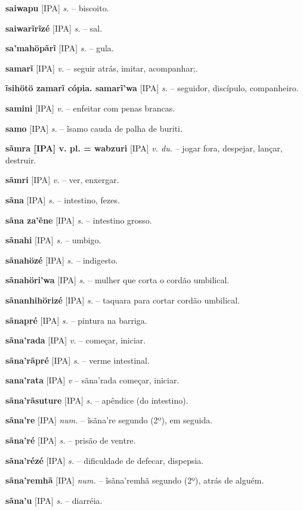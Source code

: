 {\textbf{saiwapu} [IPA] \textit{s.} -- biscoito.

\textbf{saiwarĩrĩzé} [IPA] \textit{s.} -- sal.

\textbf{sa'mahöpãrĩ} [IPA] \textit{s.} -- gula.

\textbf{samarĩ} [IPA] \textit{v.} -- seguir atrás, imitar, acompanhar;.

\textbf{ĩsihötö zamarĩ cópia. samarĩ'wa} [IPA] \textit{s.} -- seguidor, discípulo, companheiro.

\textbf{samini} [IPA] \textit{v.} -- enfeitar com penas brancas.

\textbf{samo} [IPA] \textit{s.} -- ĩsamo cauda de palha de buriti.

\textbf{sãmra [IPA] v. pl. = wabzuri} [IPA] \textit{v. du.} -- jogar fora, despejar, lançar, destruir.

\textbf{sãmri} [IPA] \textit{v.} -- ver, enxergar.

\textbf{sãna} [IPA] \textit{s.} -- intestino, fezes.

\textbf{sãna za'ẽne} [IPA] \textit{s.} -- intestino grosso.

\textbf{sãnahi} [IPA] \textit{s.} -- umbigo.

\textbf{sãnahözé} [IPA] \textit{s.} -- indigesto.

\textbf{sãnahöri'wa} [IPA] \textit{s.} -- mulher que corta o cordão umbilical.

\textbf{sãnanhihörizé} [IPA] \textit{s.} -- taquara para cortar cordão umbilical.

\textbf{sãnapré} [IPA] \textit{s.} -- pintura na barriga.

\textbf{sãna'rada} [IPA] \textit{v.} -- começar, iniciar.

\textbf{sãna'rãpré} [IPA] \textit{s.} -- verme intestinal.

\textbf{sana'rata} [IPA] \textit{v} -- sãna'rada começar, iniciar.

\textbf{sãna'rãsuture} [IPA] \textit{s.} -- apêndice (do intestino).

\textbf{sãna're} [IPA] \textit{num.} -- ĩsãna're segundo (2º), em seguida.

\textbf{sãna'ré} [IPA] \textit{s.} -- prisão de ventre.

\textbf{sãna'rézé} [IPA] \textit{s.} -- dificuldade de defecar, dispepsia.

\textbf{sãna'remhã} [IPA] \textit{num.} -- ĩsãna'remhã segundo (2º), atrás de alguém.

\textbf{sãna'u} [IPA] \textit{s.} -- diarréia.

}
